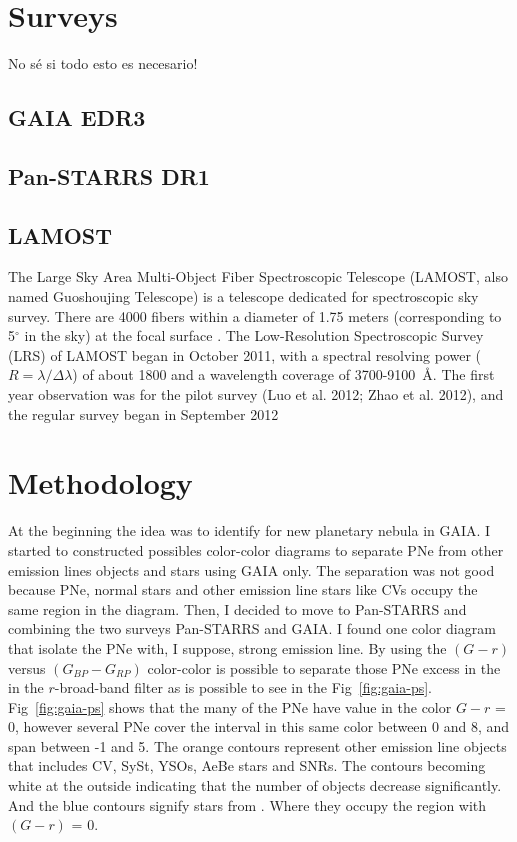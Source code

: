 \documentclass[fleqn,usenatbib]{mnras}
\begin{document}
\section{Surveys}
\label{sec:surveys}
{\sc No sé si todo esto es necesario!}

\subsection{GAIA EDR3}
\label{sec:gaia}

\subsection{Pan-STARRS DR1}
\label{sec:PS1}

\subsection{LAMOST}
\label{sec:lamost}

The Large Sky Area Multi-Object Fiber Spectroscopic Telescope
(LAMOST, also named Guoshoujing Telescope) is a
telescope dedicated for spectroscopic sky survey.
There are 4000 fibers within a diameter of 1.75 meters (corresponding
to 5$^{\circ}$ in the sky) at the focal surface \citep{Cui:2012}.
The Low-Resolution Spectroscopic Survey (LRS) of LAMOST
began in October 2011, with a spectral resolving power ($R = \lambda/\Delta\lambda$)
of about 1800 and a wavelength coverage of
3700-9100~\AA \citep{Zhao:2012}. The first year observation was
for the pilot survey (Luo et al. 2012; Zhao et al. 2012),
and the regular survey began in September 2012

\section{Methodology}
\label{sec:metho}

At the beginning the idea was to identify for new planetary nebula in GAIA.
I started to constructed possibles color-color diagrams to separate PNe from
other emission lines objects and stars using GAIA only. The separation was not
good because PNe, normal stars and other emission line stars like CVs occupy the same region
in the diagram. Then, I decided to move to Pan-STARRS and combining the two
surveys Pan-STARRS and GAIA. I found one color diagram that isolate the PNe
with, I suppose, strong \ha{} emission line. By using the \((G - r)\) versus \((G_{BP} - G_{RP})\)
color-color is possible to separate those PNe excess in the in the $r$-broad-band
filter as is possible to see in the Fig~\ref{fig:gaia-ps}. Fig~\ref{fig:gaia-ps}
shows that the many of the PNe have value in the color \(G - r\) = 0, however several
PNe cover the interval in this same color between 0 and 8, and span between -1 and 5.
The orange contours represent other emission line objects that includes CV, SySt,
YSOs, AeBe stars and SNRs. The contours becoming white at the outside indicating
that the number of objects decrease significantly. And the blue contours signify
stars from \citet{Smart:2021}. Where they occupy the region with \((G - r)\) = 0.
\end{document}
